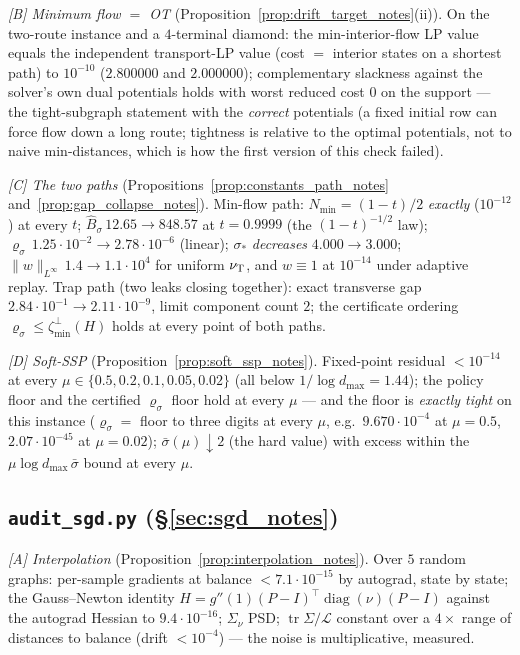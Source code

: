 \documentclass[11pt]{article}
\theoremstyle{definition}
\theoremstyle{remark}
\begin{document}
\emph{[B] Minimum flow $=$ OT} (Proposition~\ref{prop:drift_target_notes}(ii)). On the
two-route instance and a $4$-terminal diamond: the min-interior-flow LP value equals the
independent transport-LP value (cost $=$ interior states on a shortest path) to
$10^{-10}$ ($2.800000$ and $2.000000$); complementary slackness against the solver's own
dual potentials holds with worst reduced cost $0$ on the support --- the tight-subgraph
statement with the \emph{correct} potentials (a fixed initial row can force flow down a
long route; tightness is relative to the optimal potentials, not to naive
min-distances, which is how the first version of this check failed).

\emph{[C] The two paths} (Propositions~\ref{prop:constants_path_notes}
and~\ref{prop:gap_collapse_notes}). Min-flow path: $N_{\min}=(1-t)/2$ \emph{exactly}
($10^{-12}$) at every $t$; $\widehat B_\sigma\,12.65\to848.57$ at $t=0.9999$
(the $(1-t)^{-1/2}$ law); $\varrho_\sigma\,1.25\cdot10^{-2}\to2.78\cdot10^{-6}$
(linear); $\sigma_*$ \emph{decreases} $4.000\to3.000$; $\|w\|_{L^\infty}\,1.4\to1.1\cdot10^4$
for uniform $\nu_{\mathrm{T}}$, and $w\equiv1$ at $10^{-14}$ under adaptive replay. Trap path
(two leaks closing together): exact transverse gap $2.84\cdot10^{-1}\to2.11\cdot10^{-9}$,
limit component count $2$; the certificate ordering
$\varrho_\sigma\leq\zeta^\perp_{\min}(H)$ holds at every point of both paths.

\emph{[D] Soft-SSP} (Proposition~\ref{prop:soft_ssp_notes}). Fixed-point residual
$<10^{-14}$ at every $\mu\in\{0.5,0.2,0.1,0.05,0.02\}$ (all below
$1/\log d_{\max}=1.44$); the policy floor and the certified $\varrho_\sigma$ floor hold
at every $\mu$ --- and the floor is \emph{exactly tight} on this instance
($\varrho_\sigma=$ floor to three digits at every $\mu$, e.g.\
$9.670\cdot10^{-4}$ at $\mu=0.5$, $2.07\cdot10^{-45}$ at $\mu=0.02$);
$\bar\sigma(\mu)\downarrow2$ (the hard value) with excess within the
$\mu\log d_{\max}\,\bar\sigma$ bound at every $\mu$.

\subsection{\texttt{audit\_sgd.py} (\S\ref{sec:sgd_notes})}\label{sec:num_sgd_notes}

\emph{[A] Interpolation} (Proposition~\ref{prop:interpolation_notes}). Over $5$ random graphs:
per-sample gradients at balance $<7.1\cdot10^{-15}$ by autograd, state by state; the
Gauss--Newton identity $H=g''(1)(P-I)^\top\operatorname{diag}(\nu)(P-I)$ against the autograd
Hessian to $9.4\cdot10^{-16}$; $\Sigma_\nu$ PSD; $\operatorname{tr}\Sigma/\mathcal L$
constant over a $4\times$ range of distances to balance (drift $<10^{-4}$) --- the noise
is multiplicative, measured.
\end{document}
